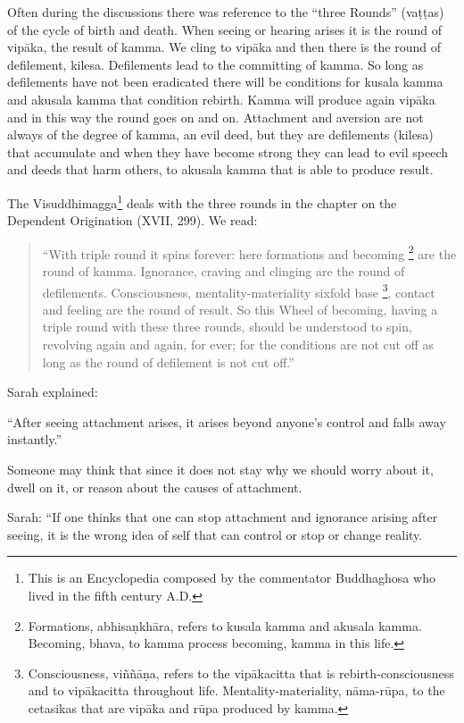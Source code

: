 Often during the discussions there was reference to the ``three Rounds''
(vaṭṭas) of the cycle of birth and death. When seeing or hearing arises
it is the round of vipāka, the result of kamma. We cling to vipāka and
then there is the round of defilement, kilesa. Defilements lead to the
committing of kamma. So long as defilements have not been eradicated
there will be conditions for kusala kamma and akusala kamma that
condition rebirth. Kamma will produce again vipāka and in this way the
round goes on and on. Attachment and aversion are not always of the
degree of kamma, an evil deed, but they are defilements (kilesa) that
accumulate and when they have become strong they can lead to evil speech
and deeds that harm others, to akusala kamma that is able to produce
result.

The Visuddhimagga\footnote{This is an Encyclopedia
composed by the commentator Buddhaghosa who lived in the fifth century
A.D.} deals
with the three rounds in the chapter on the Dependent Origination (XVII,
299). We read:

\begin{quote}

``With triple round it spins forever: here formations and becoming
\footnote{Formations,
abhisaṇkhāra, refers to kusala kamma and akusala kamma. Becoming, bhava,
to kamma process becoming, kamma in this life.} are the round of kamma.
Ignorance, craving and clinging are the round of defilements.
Consciousness, mentality-materiality sixfold base
\footnote{Consciousness,
viññāṇa, refers to the vipākacitta that is rebirth-consciousness and to
vipākacitta throughout life. Mentality-materiality, nāma-rūpa, to the
cetasikas that are vipāka and rūpa produced by kamma.}, contact and feeling
are the round of result. So this Wheel of becoming, having a triple
round with these three rounds, should be understood to spin, revolving
again and again, for ever; for the conditions are not cut off as long as
the round of defilement is not cut off.''
    
\end{quote}

Sarah explained:

``After seeing attachment arises, it arises beyond anyone's control and
falls away instantly.''

Someone may think that since it does not stay why we should worry about
it, dwell on it, or reason about the causes of attachment.

Sarah: ``If one thinks that one can stop attachment and ignorance
arising after seeing, it is the wrong idea of self that can control or
stop or change reality.

